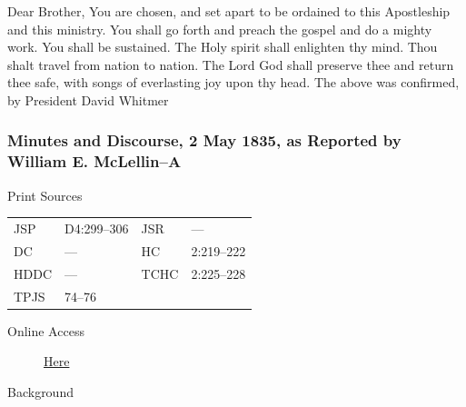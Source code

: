 				Dear Brother, You are chosen, and set apart to be ordained to this Apostleship and this ministry. You shall go forth and preach the gospel and do a mighty work. You shall be sustained. The Holy spirit shall enlighten thy mind. Thou shalt travel from nation to nation. The Lord God shall preserve thee and return thee safe, with songs of everlasting joy upon thy head. The above was confirmed, by President David Whitmer
				
		\subsubsection{Minutes and Discourse, 2 May 1835, as Reported by William E. McLellin--A}
			\label{EMS-1835-JS-2-MAY-1835-A}
			
			\begin{description}
				\item[Print Sources]
			\end{description}

				\begin{tabular}{p{0.5in}p{1in}p{0.5in}p{1in}}
				JSP	 	& D4:299--306		& JSR 		& --- \\
				DC	 	& --- 				& HC 		& 2:219--222 \\
				HDDC 	& ---				& TCHC 		& 2:225--228 \\
				TPJS 	& 74--76			& 	 		&  \\
				\end{tabular}
			
			\begin{description}
				\item[Online Access] \href{https://www.josephsmithpapers.org/paper-summary/minutes-and-discourse-2-may-1835-as-reported-by-william-e-mclellin-a/1}{Here}
			\end{description}
			
			\begin{description}
				\item[Background]
			\end{description}
			
			
